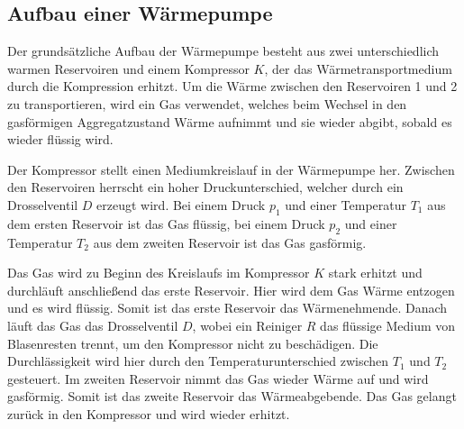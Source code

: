 \subsection{Aufbau einer Wärmepumpe}


    Der grundsätzliche Aufbau der Wärmepumpe besteht aus zwei unterschiedlich warmen Reservoiren und einem Kompressor $K$,
    der das Wärmetransportmedium durch die Kompression erhitzt.
    Um die Wärme zwischen den Reservoiren 1 und 2 zu transportieren, wird ein Gas verwendet, welches beim Wechsel in den gasförmigen
    Aggregatzustand Wärme aufnimmt und sie wieder abgibt, sobald es wieder flüssig wird.

    Der Kompressor stellt einen Mediumkreislauf in der Wärmepumpe her.
    Zwischen den Reservoiren herrscht ein hoher Druckunterschied, welcher durch ein Drosselventil $D$ erzeugt wird.
    Bei einem Druck $p_1$ und einer Temperatur $T_1$ aus dem ersten Reservoir ist das Gas flüssig,
    bei einem Druck $p_2$ und einer Temperatur $T_2$ aus dem zweiten Reservoir ist das Gas gasförmig.

    Das Gas wird zu Beginn des Kreislaufs im Kompressor $K$ stark erhitzt und durchläuft anschließend das erste Reservoir.
    Hier wird dem Gas Wärme entzogen und es wird flüssig. Somit ist das erste Reservoir das Wärmenehmende.
    Danach läuft das Gas das Drosselventil $D$, wobei ein Reiniger $R$ das flüssige Medium von Blasenresten trennt, um den Kompressor nicht zu beschädigen.
    Die Durchlässigkeit wird hier durch den Temperaturunterschied zwischen $T_1$ und $T_2$ gesteuert.
    Im zweiten Reservoir nimmt das Gas wieder Wärme auf und wird gasförmig. Somit ist das zweite Reservoir das Wärmeabgebende.
    Das Gas gelangt zurück in den Kompressor und wird wieder erhitzt.
